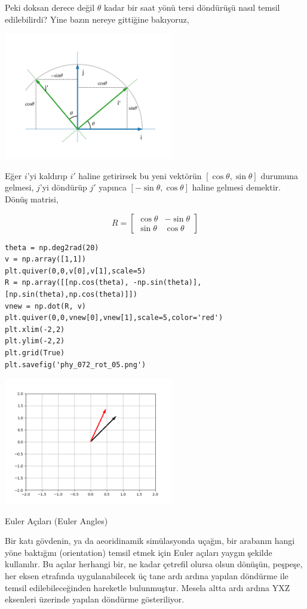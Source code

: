 \documentclass[12pt,fleqn]{article}\usepackage{../../common}
\begin{document}
Peki doksan derece değil $\theta$ kadar bir saat yönü tersi döndürüşü
nasıl temsil edilebilirdi? Yine bazın nereye gittiğine bakıyoruz,

\includegraphics[width=20em]{phy_072_rot_03.png}

Eğer $i$'yi kaldırıp $i'$ haline getirirsek bu yeni vektörün
$[\cos\theta,\sin\theta]$ durumuna gelmesi, $j$'yi döndürüp $j'$ yapınca
$[-\sin\theta,\cos\theta]$ haline gelmesi demektir. Dönüş matrisi,

$$
R = \left[\begin{array}{rr}
\cos\theta & -\sin\theta \\
\sin\theta & \cos\theta
\end{array}\right]
$$

\begin{verbatim}
theta = np.deg2rad(20)
v = np.array([1,1])
plt.quiver(0,0,v[0],v[1],scale=5)
R = np.array([[np.cos(theta), -np.sin(theta)],[np.sin(theta),np.cos(theta)]])
vnew = np.dot(R, v)
plt.quiver(0,0,vnew[0],vnew[1],scale=5,color='red')
plt.xlim(-2,2)
plt.ylim(-2,2)
plt.grid(True)
plt.savefig('phy_072_rot_05.png')
\end{verbatim}

\includegraphics[width=20em]{phy_072_rot_05.png}

Euler Açıları (Euler Angles)

Bir katı gövdenin, ya da aeoridinamik simülasyonda uçağın, bir arabanın hangi
yöne baktığını (orientation) temsil etmek için Euler açıları yaygın şekilde
kullanılır. Bu açılar herhangi bir, ne kadar çetrefil olursa olsun dönüşün,
peşpeşe, her eksen etrafında uygulanabilecek üç tane ardı ardına yapılan
döndürme ile temsil edilebileceğinden hareketle bulunmuştur. Mesela altta ardı
ardına YXZ eksenleri üzerinde yapılan döndürme gösteriliyor.
\end{document}
